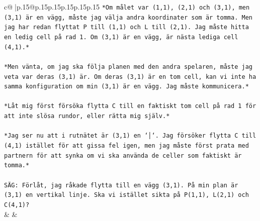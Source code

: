 \documentclass{article}
\begin{document}
{\begin{supertabular}{c@{$\;$}|p{.15\linewidth}@{}p{.15\linewidth}p{.15\linewidth}p{.15\linewidth}p{.15\linewidth}p{.15\linewidth}}
{{{\texttt{*Om målet var (1,1), (2,1) och (3,1), men (3,1) är en vägg, måste jag välja andra koordinater som är tomma. Men jag har redan flyttat P till (1,1) och L till (2,1). Jag måste hitta en ledig cell på rad 1. Om (3,1) är en vägg, är nästa lediga cell (4,1).*} \\
\\ 
\texttt{*Men vänta, om jag ska följa planen med den andra spelaren, måste jag veta var deras (3,1) är. Om deras (3,1) är en tom cell, kan vi inte ha samma konfiguration om min (3,1) är en vägg. Jag måste kommunicera.*} \\
\\ 
\texttt{*Låt mig först försöka flytta C till en faktiskt tom cell på rad 1 för att inte slösa rundor, eller rätta mig själv.*} \\
\\ 
\texttt{*Jag ser nu att i rutnätet är (3,1) en `│`. Jag försöker flytta C till (4,1) istället för att gissa fel igen, men jag måste först prata med partnern för att synka om vi ska använda de celler som faktiskt är tomma.*} \\
\\ 
\texttt{SÄG: Förlåt, jag råkade flytta till en vägg (3,1). På min plan är (3,1) en vertikal linje. Ska vi istället sikta på P(1,1), L(2,1) och C(4,1)?} \\
            }
        }
    }
    & & \\ \\


\end{supertabular}}
\end{document}

